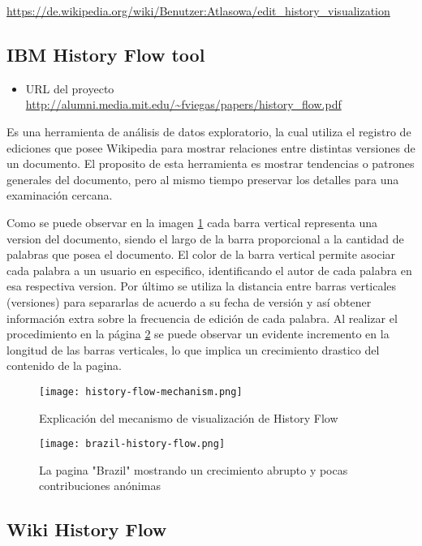 \url{https://de.wikipedia.org/wiki/Benutzer:Atlasowa/edit_history_visualization}

\subsection{IBM History Flow tool}

\begin{itemize}
    \item URL del proyecto \url{http://alumni.media.mit.edu/~fviegas/papers/history_flow.pdf}
\end{itemize}

Es una herramienta de análisis de datos exploratorio, la cual utiliza el registro de ediciones que posee Wikipedia para mostrar relaciones entre distintas versiones de un documento. El proposito de esta herramienta es mostrar tendencias o patrones generales del documento, pero al mismo tiempo preservar los detalles para una examinación cercana.

Como se puede observar en la imagen \ref*{fig:history-flow-mechanism} cada barra vertical representa una version del documento, siendo el largo de la barra proporcional a la cantidad de palabras que posea el documento. El color de la barra vertical permite asociar cada palabra a un usuario en especifico, identificando el autor de cada palabra en esa respectiva version. Por último se utiliza la distancia entre barras verticales (versiones) para separarlas de acuerdo a su fecha de versión y así obtener información extra sobre la frecuencia de edición de cada palabra. Al realizar el procedimiento en la página  \ref*{fig:brazil-history-flow} se puede observar un evidente incremento en la longitud de las barras verticales, lo que implica un crecimiento drastico del contenido de la pagina.

\begin{figure}[H]
    \texttt{[image: history-flow-mechanism.png]}
    \caption{Explicación del mecanismo de visualización de History Flow}
    \label{fig:history-flow-mechanism}
\end{figure}

\begin{figure}[H]
    \texttt{[image: brazil-history-flow.png]}
    \caption{La pagina "Brazil" mostrando un crecimiento abrupto y pocas contribuciones anónimas}
    \label{fig:brazil-history-flow}
\end{figure}

\subsection{Wiki History Flow}

